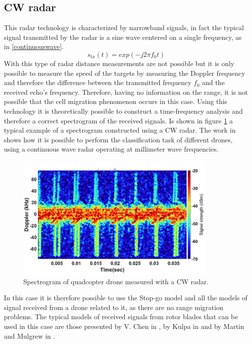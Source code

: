 \subsection{CW radar}
This radar technology is characterized by narrowband signals, in fact the typical signal transmitted by the radar is a sine wave centered on a single frequency, as in \ref{continuouswave}.
\begin{equation}
    s_{tx}(t) = exp(-j2\pi f_0 t)
    \label{continuouswave}
\end{equation}
With this type of radar distance measurements are not possible but it is only possible to measure the speed of the targets by measuring the Doppler frequency and therefore the difference between the transmitted frequency $ f_0 $ and the received echo's frequency.
Therefore, having no information on the range, it is not possible that the cell migration phenomenon  occurs in this case. Using this technology it is theoretically possible to construct a time-frequency analysis and therefore a correct spectrogram of the received signals. Is shown in figure \ref{CWspectrogram} a typical example of a spectrogram constructed using a CW radar. The work in \cite{CWmicroDoppler} shows how it is possible to perform the classification task of different drones, using a continuous wave radar operating at millimeter wave frequencies.
\begin{figure}[h!]
    \centering
    \includegraphics[width=10cm]{Time-frequency analysis-chap3/img/CW micro D spectrogram.png}
    \caption{Spectrogram of quadcopter drone measured with a CW radar.\cite{CWmicroDoppler} }
    \label{CWspectrogram}
\end{figure}
In this case it is therefore possible to use the Stop-go model and all the models of signal received from a drone related to it, as there are no range migration problems. The typical models of received signals from rotor blades that can be used in this case are those presented by V. Chen in \cite{microdoppler_chen}, by Kulpa in \cite{kulpa} and by Martin and Mulgrew in \cite{MartinMulgrew}.


